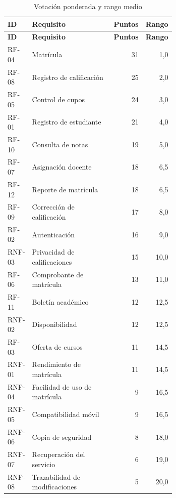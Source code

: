 \begingroup
\small
\begin{longtable}{@{}p{0.13\linewidth}p{0.53\linewidth}rr@{}}
\caption{Votación ponderada y rango medio}\label{tab:resultados-votacion}\\
\toprule
\textbf{ID} & \textbf{Requisito} & \textbf{Puntos} & \textbf{Rango}\\
\midrule
\endfirsthead
\toprule
\textbf{ID} & \textbf{Requisito} & \textbf{Puntos} & \textbf{Rango}\\
\midrule
\endhead
\bottomrule
\endlastfoot
RF-04 & Matrícula & 31 & 1,0\\
RF-08 & Registro de calificación & 25 & 2,0\\
RF-05 & Control de cupos & 24 & 3,0\\
RF-01 & Registro de estudiante & 21 & 4,0\\
RF-10 & Consulta de notas & 19 & 5,0\\
RF-07 & Asignación docente & 18 & 6,5\\
RF-12 & Reporte de matrícula & 18 & 6,5\\
RF-09 & Corrección de calificación & 17 & 8,0\\
RF-02 & Autenticación & 16 & 9,0\\
RNF-03 & Privacidad de calificaciones & 15 & 10,0\\
RF-06 & Comprobante de matrícula & 13 & 11,0\\
RF-11 & Boletín académico & 12 & 12,5\\
RNF-02 & Disponibilidad & 12 & 12,5\\
RF-03 & Oferta de cursos & 11 & 14,5\\
RNF-01 & Rendimiento de matrícula & 11 & 14,5\\
RNF-04 & Facilidad de uso de matrícula & 9 & 16,5\\
RNF-05 & Compatibilidad móvil & 9 & 16,5\\
RNF-06 & Copia de seguridad & 8 & 18,0\\
RNF-07 & Recuperación del servicio & 6 & 19,0\\
RNF-08 & Trazabilidad de modificaciones & 5 & 20,0\\
\end{longtable}
\endgroup
